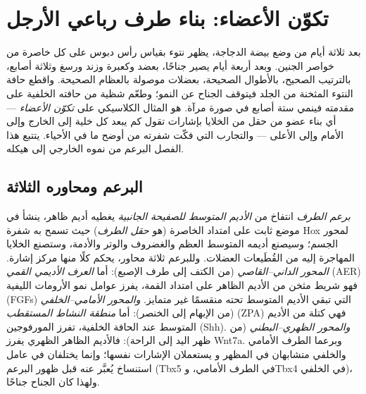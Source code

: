 \chapter{تكوّن الأعضاء: بناء طرف رباعي الأرجل}\label{ch:b2:limb-organogenesis}

بعد ثلاثة أيام من وضع بيضة الدجاجة، يظهر نتوء بقياس رأس دبوس
على كل خاصرة من خواصر الجنين. وبعد أربعة أيام يصير جناحًا،
بعضد وكعبرة وزند ورسغ وثلاثة أصابع، بالترتيب
الصحيح، بالأطوال الصحيحة، بعضلات موصولة بالعظام
الصحيحة. واقطع حافة النتوء المثخنة من الجلد فيتوقف الجناح
عن النمو؛ وطعّم شظية من حافته الخلفية على مقدمته
فينمي ستة أصابع في صورة مرآة.  هو المثال
الكلاسيكي على \emph{تكوّن الأعضاء} --- أي بناء عضو من
حقل من الخلايا بإشارات تقول كم يبعد كل خلية إلى الخارج وإلى الأمام
وإلى الأعلى --- والتجارب التي فكّت شفرته من
أوضح ما في الأحياء. يتتبع هذا الفصل البرعم من
نموه الخارجي إلى هيكله.

\section{البرعم ومحاوره الثلاثة}

\begin{definition}\label{def:b2:limb-organogenesis:bud}
\emph{برعم الطرف} انتفاخ من \emph{الأديم المتوسط للصفيحة الجانبية}
يغطيه أديم ظاهر، ينشأ في موضع ثابت على امتداد الخاصرة
(هو \emph{حقل الطرف}) حيث تسمح به شفرة Hox لمحور الجسم؛
وسيصنع أديمه المتوسط العظم والغضروف والوتر والأدمة، وستصنع
الخلايا المهاجرة إليه من القُطَيعات العضلات.
وللبرعم ثلاثة محاور، يحكم كلًا منها مركز إشارة.
\emph{المحور الداني--القاصي} (من الكتف إلى طرف الإصبع): أما \emph{العرف
الأديمي القمي} (AER) فهو شريط مثخن من الأديم الظاهر على امتداد
القمة، يفرز عوامل نمو الأرومات الليفية (FGFs) التي تبقي
الأديم المتوسط تحته منقسمًا غير متمايز.
\emph{والمحور الأمامي--الخلفي} (من الإبهام إلى الخنصر): أما \emph{منطقة
النشاط المستقطب} (ZPA) فهي كتلة من الأديم المتوسط عند الحافة
الخلفية، تفرز المورفوجين \emph{} (Shh).
\emph{والمحور الظهري--البطني} (من ظهر اليد إلى الراحة): فالأديم الظاهر
الظهري يفرز Wnt7a. وبرعما الطرف الأمامي والخلفي متشابهان في المظهر و
يستعملان الإشارات نفسها؛ وإنما يختلفان في عامل استنساخ
يُعبَّر عنه قبل ظهور البرعم (Tbx5 في الطرف الأمامي، وTbx4 في
الخلفي)، ولهذا كان الجناح جناحًا.
\end{definition}

